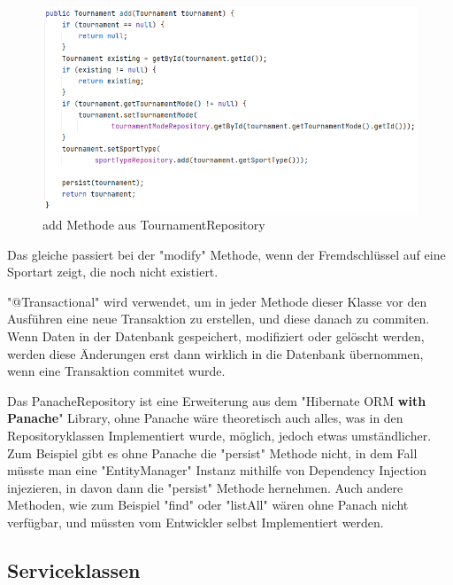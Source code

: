 \begin{figure}[H]
    \includegraphics[scale=0.8]{pics/backend/repository_add_function.png}
    \caption{add Methode aus TournamentRepository}
\end{figure}

Das gleiche passiert bei der "modify" Methode, wenn der Fremdschlüssel auf eine Sportart zeigt, die noch nicht existiert.

"@Transactional" wird verwendet, um in jeder Methode dieser Klasse vor den Ausführen eine neue Transaktion zu erstellen, und diese danach zu commiten. 
Wenn Daten in der Datenbank gespeichert, modifiziert oder gelöscht werden, werden diese Änderungen erst dann wirklich in die Datenbank übernommen, wenn eine Transaktion commitet wurde.

Das PanacheRepository ist eine Erweiterung aus dem "Hibernate ORM \textbf{with Panache}" Library, ohne Panache wäre theoretisch auch alles, was in den Repositoryklassen Implementiert wurde, möglich, jedoch etwas umständlicher.
Zum Beispiel gibt es ohne Panache die "persist" Methode nicht, in dem Fall müsste man eine "EntityManager" Instanz mithilfe von Dependency Injection injezieren, in davon dann die "persist" Methode hernehmen.
Auch andere Methoden, wie zum Beispiel "find" oder "listAll" wären ohne Panach nicht verfügbar, und müssten vom Entwickler selbst Implementiert werden.

\subsection{Serviceklassen}

